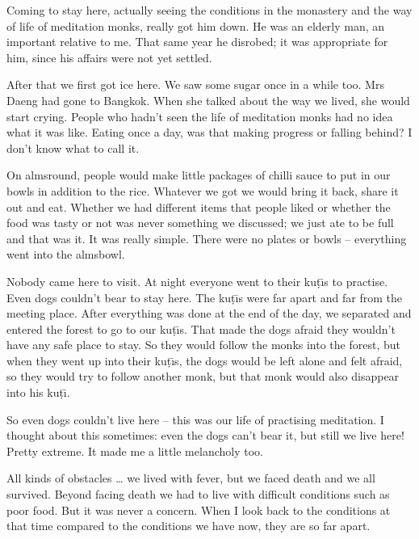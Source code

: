 Coming to stay here, actually seeing the conditions in the monastery and the way of life of meditation monks, really got him down. He was an elderly man, an important relative to me. That same year he disrobed; it was appropriate for him, since his affairs were not yet settled. 

After that we first got ice here. We saw some sugar once in a while too. Mrs Daeng had gone to Bangkok. When she talked about the way we lived, she would start crying. People who hadn't seen the life of meditation monks had no idea what it was like. Eating once a day, was that making progress or falling behind? I don't know what to call it. 

On almsround, people would make little packages of chilli sauce to put in our bowls in addition to the rice. Whatever we got we would bring it back, share it out and eat. Whether we had different items that people liked or whether the food was tasty or not was never something we discussed; we just ate to be full and that was it. It was really simple. There were no plates or bowls -- everything went into the almsbowl. 

Nobody came here to visit. At night everyone went to their ku\d{t}\={\i}s to practise. Even dogs couldn't bear to stay here. The ku\d{t}\={\i}s were far apart and far from the meeting place. After everything was done at the end of the day, we separated and entered the forest to go to our ku\d{t}\={\i}s. That made the dogs afraid they wouldn't have any safe place to stay. So they would follow the monks into the forest, but when they went up into their ku\d{t}\={\i}s, the dogs would be left alone and felt afraid, so they would try to follow another monk, but that monk would also disappear into his ku\d{t}\={\i}. 

So even dogs couldn't live here -- this was our life of practising meditation. I thought about this sometimes: even the dogs can't bear it, but still we live here! Pretty extreme. It made me a little melancholy too. 

All kinds of obstacles \ldots{} we lived with fever, but we faced death and we all survived. Beyond facing death we had to live with difficult conditions such as poor food. But it was never a concern. When I look back to the conditions at that time compared to the conditions we have now, they are so far apart. 

